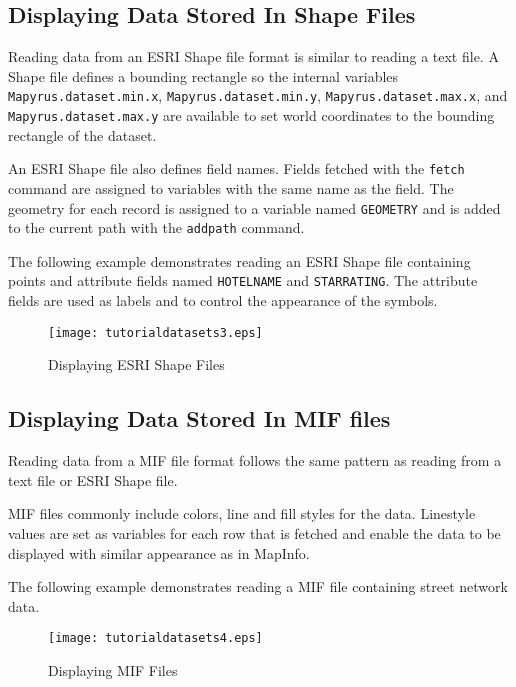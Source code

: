 \subsection{Displaying Data Stored In Shape Files}

Reading data from an ESRI Shape file format is similar to reading a text file.
A Shape file defines a bounding rectangle so the internal variables
\texttt{Mapyrus.dataset.min.x}, \texttt{Mapyrus.dataset.min.y},
\texttt{Mapyrus.dataset.max.x}, and \texttt{Mapyrus.dataset.max.y} are
available to set world coordinates to the bounding rectangle of the dataset.

An ESRI Shape file also defines field names.  Fields fetched with the
\texttt{fetch} command are assigned to variables with the same name as the
field.  The geometry for each record is assigned to a variable named
\texttt{GEOMETRY} and is added to the current path with the \texttt{addpath}
command.

The following example demonstrates reading an ESRI Shape file containing points
and attribute fields named \texttt{HOTELNAME} and \texttt{STARRATING}.  The
attribute fields are used as labels and to control the appearance of the
symbols.



\begin{figure}[htb]
\texttt{[image: tutorialdatasets3.eps]}
\caption{Displaying ESRI Shape Files}
\label{tutorialdatasets3}
\end{figure}

\subsection{Displaying Data Stored In MIF files}

Reading data from a MIF file format follows the same pattern as reading
from a text file or ESRI Shape file.

MIF files commonly include colors, line and fill styles for the data.
Linestyle values are set as variables
for each row that is fetched and enable the data to be displayed with
similar appearance as in MapInfo.

The following example demonstrates reading a MIF file containing
street network data.



\begin{figure}[htb]
\texttt{[image: tutorialdatasets4.eps]}
\caption{Displaying MIF Files}
\label{tutorialdatasets4}
\end{figure}


